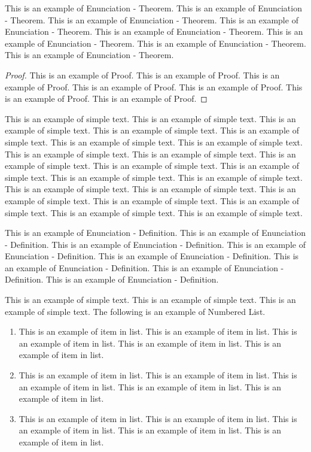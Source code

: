\documentclass[11pt]{now}
\begin{document}
\begin{theorem}
This is an example of Enunciation - Theorem. This is an example
of Enunciation - Theorem.  This is an example of Enunciation - Theorem. This is an
example of Enunciation - Theorem.  This is an example of Enunciation - Theorem. This is
an example of Enunciation - Theorem.  This is an example of Enunciation - Theorem. This
is an example of Enunciation - Theorem.
\end{theorem}
\begin{proof}
This is an example of Proof. This is an
example of Proof.  This is an example of Proof. This is
an example of Proof.  This is an example of Proof. This
is an example of Proof.  This is an example of Proof.
\end{proof}

This is an example of simple text.  This is an example of simple
text. This is an example of simple text.  This is an example of
simple text. This is an example of simple text.  This is an example
of simple text. This is an example of simple text.  This is an
example of simple text. This is an example of simple text.  This is
an example of simple text. This is an example of simple text.  This
is an example of simple text. This is an example of simple text.
This is an example of simple text. This is an example of simple text.
This is an example of simple text. This is an example of simple text.
This is an example of simple text. This is an example of simple text.
This is an example of simple text. This is an example of simple text.

\begin{definition}
This is an example of Enunciation - Definition. This is an example
of Enunciation - Definition.  This is an example of Enunciation - Definition. This is an
example of Enunciation - Definition.  This is an example of Enunciation - Definition. This is
an example of Enunciation - Definition.  This is an example of Enunciation - Definition. This
is an example of Enunciation - Definition.
\end{definition}

                   This is an example of simple text. This is an
example of simple text.  This is an example of simple text. The following is
an example of Numbered List.

\begin{enumerate}[(1)]
\item This is an example of item in list. This
is an example of item in list.  This is an example of item in list.
This is an example of item in list.  This is an example of item in list.
\item This is an example of item in list. This
is an example of item in list.  This is an example of item in list.
This is an example of item in list.  This is an example of item in list.

\item This is an example of item in list. This
is an example of item in list.  This is an example of item in list.
This is an example of item in list.  This is an example of item in list.
\end{enumerate}
\end{document}
